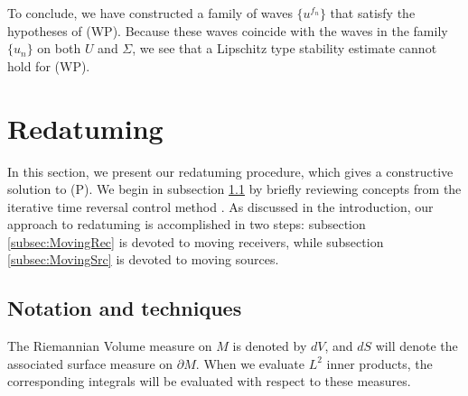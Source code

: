 \documentclass[final,leqno]{siamart1116}
\begin{document}
To conclude, we have constructed a family of waves $\{u^{f_n}\}$ that
satisfy the hypotheses of (WP). Because these waves coincide with the
waves in the family $\{u_n\}$ on both $U$ and $\Sigma$, we see that a
Lipschitz type stability estimate cannot hold for (WP).
 

\section{Redatuming}
\label{sec:MovingData}

In this section, we present our redatuming procedure, which gives a
constructive solution to (P). We begin in subsection \ref{subsec:BCM}
by briefly reviewing
concepts from the iterative time reversal control method \cite{Bingham2008}.
As discussed in the introduction,
our approach to redatuming is
accomplished in two steps: subsection
\ref{subsec:MovingRec} is devoted to moving receivers, while
subsection \ref{subsec:MovingSrc} is devoted to moving sources.

\subsection{Notation and techniques}
\label{subsec:BCM}
The Riemannian Volume measure on $M$ is denoted by $dV$, and $dS$ will
denote the associated surface measure on ${\partial} M$. When we evaluate $L^2$
inner products, the corresponding integrals will be evaluated with
respect to these measures. 
\end{document}
